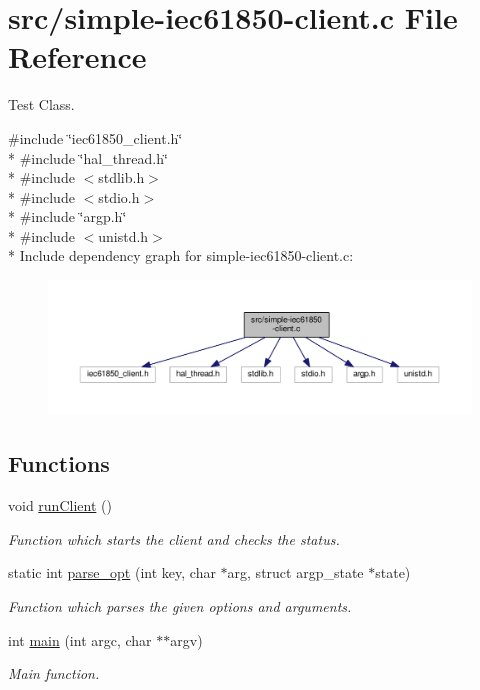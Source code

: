 \hypertarget{simple-iec61850-client_8c}{}\section{src/simple-\/iec61850-\/client.c File Reference}
\label{simple-iec61850-client_8c}


Test Class.  


{\ttfamily \#include \char`\"{}iec61850\+\_\+client.\+h\char`\"{}}\\*
{\ttfamily \#include \char`\"{}hal\+\_\+thread.\+h\char`\"{}}\\*
{\ttfamily \#include $<$stdlib.\+h$>$}\\*
{\ttfamily \#include $<$stdio.\+h$>$}\\*
{\ttfamily \#include \char`\"{}argp.\+h\char`\"{}}\\*
{\ttfamily \#include $<$unistd.\+h$>$}\\*
Include dependency graph for simple-\/iec61850-\/client.c\+:\nopagebreak
\begin{figure}[H]
\begin{center}
\leavevmode
\includegraphics[width=350pt]{simple-iec61850-client_8c__incl}
\end{center}
\end{figure}
\subsection*{Functions}
\begin{DoxyCompactItemize}
\item 
void \hyperlink{simple-iec61850-client_8c_a19c4ac63742805a0bfd8fc4a512b42d3}{run\+Client} ()
\begin{DoxyCompactList}\small\item\em Function which starts the client and checks the status. \end{DoxyCompactList}\item 
static int \hyperlink{simple-iec61850-client_8c_aaf7bc24f3891f0c63a6043f4dc2ab311}{parse\+\_\+opt} (int key, char $\ast$arg, struct argp\+\_\+state $\ast$state)
\begin{DoxyCompactList}\small\item\em Function which parses the given options and arguments. \end{DoxyCompactList}\item 
int \hyperlink{simple-iec61850-client_8c_a3c04138a5bfe5d72780bb7e82a18e627}{main} (int argc, char $\ast$$\ast$argv)
\begin{DoxyCompactList}\small\item\em Main function. \end{DoxyCompactList}\end{DoxyCompactItemize}
